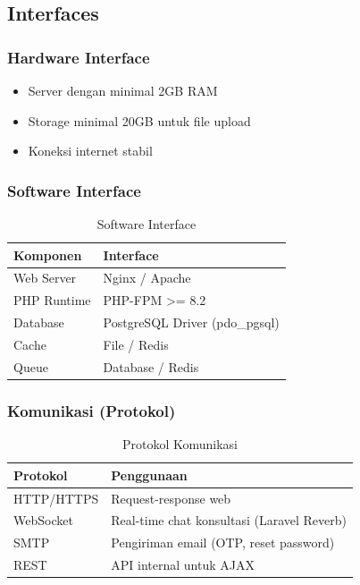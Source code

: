 \documentclass[12pt,a4paper]{article}
\begin{document}
\subsection{Interfaces}

\subsubsection{Hardware Interface}
\begin{itemize}
    \item Server dengan minimal 2GB RAM
    \item Storage minimal 20GB untuk file upload
    \item Koneksi internet stabil
\end{itemize}

\subsubsection{Software Interface}
\begin{table}[h]
\centering
\begin{tabular}{|l|l|}
\hline
\textbf{Komponen} & \textbf{Interface} \\
\hline
Web Server & Nginx / Apache \\
PHP Runtime & PHP-FPM >= 8.2 \\
Database & PostgreSQL Driver (pdo\_pgsql) \\
Cache & File / Redis \\
Queue & Database / Redis \\
\hline
\end{tabular}
\caption{Software Interface}
\end{table}

\subsubsection{Komunikasi (Protokol)}
\begin{table}[h]
\centering
\begin{tabular}{|l|p{8cm}|}
\hline
\textbf{Protokol} & \textbf{Penggunaan} \\
\hline
HTTP/HTTPS & Request-response web \\
WebSocket & Real-time chat konsultasi (Laravel Reverb) \\
SMTP & Pengiriman email (OTP, reset password) \\
REST & API internal untuk AJAX \\
\hline
\end{tabular}
\caption{Protokol Komunikasi}
\end{table}
\end{document}
